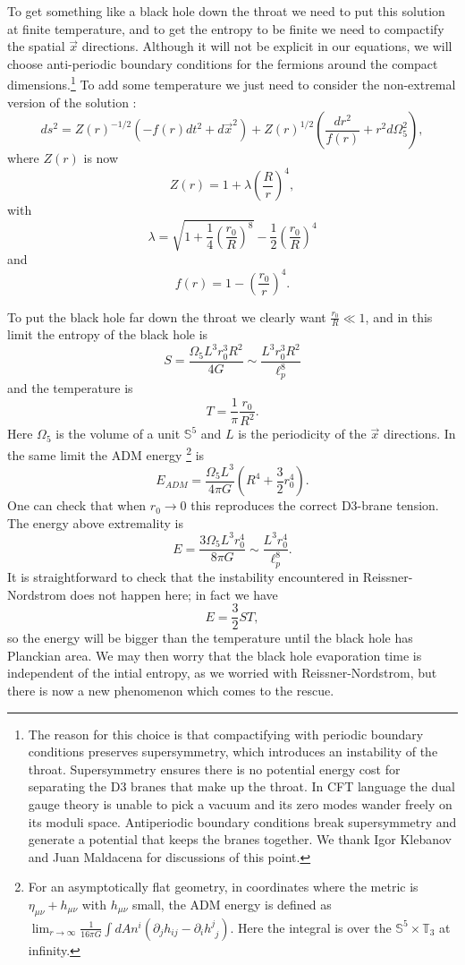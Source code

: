 \documentclass[12pt]{article}
\newcommand{\be}{\begin{equation}}
\newcommand{\ee}{\end{equation}}
\begin{document}
To get something like a black hole down the throat we need to put this solution at finite temperature, and to get the entropy to be finite we need to compactify the spatial $\vec{x}$ directions.  Although it will not be explicit in our equations, we will choose anti-periodic boundary conditions for the fermions around the compact dimensions.\footnote{The reason for this choice is that compactifying with periodic boundary conditions preserves supersymmetry, which introduces an instability of the throat.  Supersymmetry ensures there is no potential energy cost for separating the D3 branes that make up the throat.  In CFT language the dual gauge theory is unable to pick a vacuum and its zero modes wander freely on its moduli space.  Antiperiodic boundary conditions break supersymmetry and generate a potential that keeps the branes together.  We thank Igor Klebanov and Juan Maldacena for discussions of this point.}  To add some temperature we just need to consider the non-extremal version of the solution \cite{Gubser:1996de}:
\be\label{nonext}
ds^2=Z(r)^{-1/2}\left(-f(r)dt^2+d\vec{x}^2\right)+Z(r)^{1/2}\left(\frac{dr^2}{f(r)}+r^2 d\Omega_5^2\right),
\ee
where $Z(r)$ is now 
\be
Z(r)=1+\lambda \left(\frac{R}{r}\right)^4,
\ee
with 
\be
\lambda=\sqrt{1+\frac{1}{4}\left(\frac{r_0}{R}\right)^8}-\frac{1}{2}\left(\frac{r_0}{R}\right)^4
\ee
and
\be
f(r)=1-\left(\frac{r_0}{r}\right)^4.
\ee

To put the black hole far down the throat we clearly want $\frac{r_0}{R}\ll1$, and in this limit the entropy of the black hole is
\be\label{ent}
S=\frac{\Omega_5 L^3r_0^3R^2}{4G}\sim \frac{L^3 r_0^3 R^2}{\ell_p^8}
\ee
and the temperature is
\be\label{temp}
T=\frac{1}{\pi}\frac{r_0}{R^2}.
\ee
Here $\Omega_5$ is the volume of a unit $\mathbb{S}^5$ and $L$ is the periodicity of the $\vec{x}$ directions.  In the same limit the ADM energy \footnote{For an asymptotically flat geometry, in coordinates where the metric is $\eta_{\mu\nu}+h_{\mu\nu}$ with $h_{\mu\nu}$ small, the ADM energy is defined \cite{PhysRev.122.997} as $\lim_{r\to \infty}\frac{1}{16\pi G}\int dA n^{i}\left(\partial_j h_{ij}-\partial_i h^j_{\phantom{j}j}\right)$.  Here the integral is over the $\mathbb{S}^5\times \mathbb{T}_3$ at infinity.} is
\be
E_{ADM}=\frac{\Omega_5L^3}{4\pi G}\left(R^4+\frac{3}{2}r_0^4\right).
\ee
One can check that when $r_0\to 0$ this reproduces the correct D3-brane tension.  The energy above extremality is
\be\label{eng}
E=\frac{3\Omega_5 L^3 r_0^4}{8 \pi G}\sim \frac{L^3 r_0^4}{\ell_p^8}.
\ee
It is straightforward to check that the instability encountered in Reissner-Nordstrom does not happen here; in fact we have
\be\label{engent}
E=\frac{3}{2} S T,
\ee
so the energy will be bigger than the temperature until the black hole has Planckian area.  We may then worry that the black hole evaporation time is independent of the intial entropy, as we worried with Reissner-Nordstrom, but there is now a new phenomenon which comes to the rescue.
\end{document}

